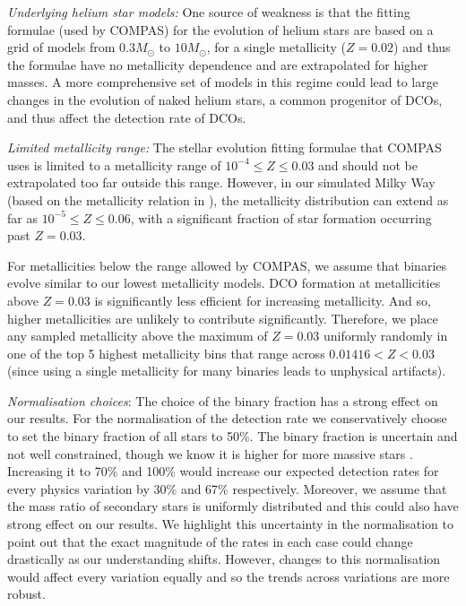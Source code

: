 \textit{Underlying helium star models:} One source of weakness is that the \citet{Hurley+2000} fitting formulae (used by COMPAS) for the evolution of helium stars are based on a grid of models from $0.3 \unit{M_{\odot}}$ to $10 \unit{M_{\odot}}$, for a single metallicity ($Z= 0.02$) and thus the formulae have no metallicity dependence and are extrapolated for higher masses. A more comprehensive set of models in this regime could lead to large changes in the evolution of naked helium stars, a common progenitor of DCOs, and thus affect the detection rate of DCOs.

\textit{Limited metallicity range:} The stellar evolution fitting formulae that COMPAS uses is limited to a metallicity range of $10^{-4} \le Z \le 0.03$ \citep{Hurley+2000} and should not be extrapolated too far outside this range. However, in our simulated Milky Way (based on the metallicity relation in \citealt{Frankel+2018}), the metallicity distribution can extend as far as $10^{-5} \le Z \le 0.06$, with a significant fraction of star formation occurring past $Z = 0.03$. 

For metallicities below the range allowed by COMPAS, we assume that binaries evolve similar to our lowest metallicity models. DCO formation at metallicities above $Z = 0.03$ is significantly less efficient for increasing metallicity. And so, higher metallicities are unlikely to contribute significantly. Therefore, we place any sampled metallicity above the maximum of $Z = 0.03$ uniformly randomly in one of the top 5 highest metallicity bins that range across $0.01416 < Z < 0.03$ (since using a single metallicity for many binaries leads to unphysical artifacts).

\textit{Normalisation choices}: The choice of the binary fraction has a strong effect on our results. For the normalisation of the detection rate we conservatively choose to set the binary fraction of all stars to 50\%. The binary fraction is uncertain and not well constrained, though we know it is higher for more massive stars \citep[e.g.][]{Sana+2012}. Increasing it to 70\% and 100\% would increase our expected detection rates for every physics variation by 30\% and 67\% respectively. Moreover, we assume that the mass ratio of secondary stars is uniformly distributed and this could also have strong effect on our results. We highlight this uncertainty in the normalisation to point out that the exact magnitude of the rates in each case could change drastically as our understanding shifts. However, changes to this normalisation would affect every variation equally and so the trends across variations are more robust.

